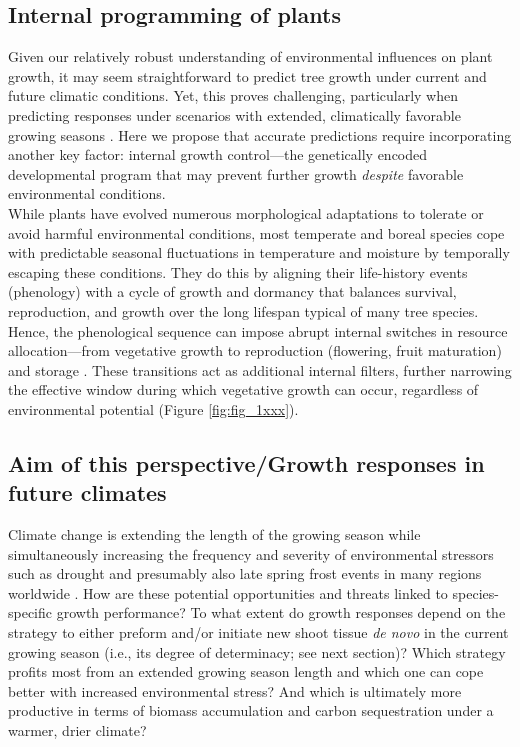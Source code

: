 \documentclass{article}
\begin{document}
		\subsection*{Internal programming of plants}
		Given our relatively robust understanding of environmental influences on plant growth, it may seem straightforward to predict tree growth under current and future climatic conditions. Yet, this proves challenging, particularly when predicting responses under scenarios with extended, climatically favorable growing seasons \citep{zohnerHowChangesSpring2021}. Here we propose that accurate predictions require incorporating another key factor: internal growth control---the genetically encoded developmental program that may prevent further growth \textit{despite} favorable environmental conditions.\\
		
		While plants have evolved numerous morphological adaptations to tolerate or avoid harmful environmental conditions, most temperate and boreal species cope with predictable seasonal fluctuations in temperature and moisture by temporally escaping these conditions. They do this by aligning their life-history events (phenology) with a cycle of growth and dormancy that balances survival, reproduction, and growth over the long lifespan typical of many tree species. Hence, the phenological sequence can impose abrupt internal switches in resource allocation---from vegetative growth to reproduction (flowering, fruit maturation) and storage \citep{stearnsTradeOffsLifeHistoryEvolution1989, chapinEcologyEconomicsStorage1990}. These transitions act as additional internal filters, further narrowing the effective window during which vegetative growth can occur, regardless of environmental potential (Figure \ref{fig:fig_1xxx}).\\
		
		\subsection*{Aim of this perspective/Growth responses in future climates}%
		Climate change is extending the length of the growing season while simultaneously increasing the frequency and severity of environmental stressors such as drought \citep{haoChangesSeverityCompound2018} and presumably also late spring frost events in many regions worldwide \citep{zohnerLatespringFrostRisk2020}. How are these potential opportunities and threats linked to species-specific growth performance? To what extent do growth responses depend on the strategy to either preform and/or initiate new shoot tissue \textit{de novo} in the current growing season (i.e., its degree of determinacy; see next section)? Which strategy profits most from an extended growing season length and which one can cope better with increased environmental stress? And which is ultimately more productive in terms of biomass accumulation and carbon sequestration under a warmer, drier climate?
		
\end{document}
